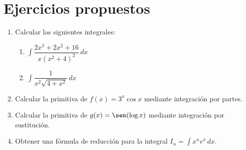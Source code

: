 \section{Ejercicios propuestos}
\begin{enumerate}[leftmargin=*]
\item Calcular las siguientes integrales:
\begin{enumerate}
\item $ \int{\dfrac{2x^{3}+2x^{2}+16}{x(x^{2}+4)^{2}}\,dx}$
\item $ \int{\dfrac{1}{x^{2}\sqrt{4+x^{2}}}\,dx}$
\end{enumerate}
\item Calcular la primitiva de $f(x)=3^{x}\cos{x}$ mediante integración por partes.
\item Calcular la primitiva de $g(x)=\sen({\log{x}})$ mediante integración por sustitución.
\item Obtener una fórmula de reducción para la integral $I_{n}=\int{x^{n}e^{x}\,dx}$.
\end{enumerate}